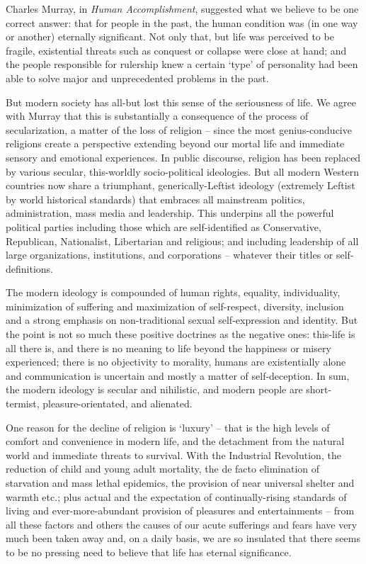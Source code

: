 \documentclass[
]{book}
\begin{document}
Charles Murray, in \emph{Human Accomplishment}, suggested what we believe to be one correct answer: that for people in the past, the human condition was (in one way or another) eternally significant. Not only that, but life was perceived to be fragile, existential threats such as conquest or collapse were close at hand; and the people responsible for rulership knew a certain `type' of personality had been able to solve major and unprecedented problems in the past.

But modern society has all-but lost this sense of the seriousness of life. We agree with Murray that this is substantially a consequence of the process of secularization, a matter of the loss of religion -- since the most genius-conducive religions create a perspective extending beyond our mortal life and immediate sensory and emotional experiences. In public discourse, religion has been replaced by various secular, this-worldly socio-political ideologies. But all modern Western countries now share a triumphant, generically-Leftist ideology (extremely Leftist by world historical standards) that embraces all mainstream politics, administration, mass media and leadership. This underpins all the powerful political parties including those which are self-identified as Conservative, Republican, Nationalist, Libertarian and religious; and including leadership of all large organizations, institutions, and corporations -- whatever their titles or self-definitions.

The modern ideology is compounded of human rights, equality, individuality, minimization of suffering and maximization of self-respect, diversity, inclusion and a strong emphasis on non-traditional sexual self-expression and identity. But the point is not so much these positive doctrines as the negative ones: this-life is all there is, and there is no meaning to life beyond the happiness or misery experienced; there is no objectivity to morality, humans are existentially alone and communication is uncertain and mostly a matter of self-deception. In sum, the modern ideology is secular and nihilistic, and modern people are short-termist, pleasure-orientated, and alienated.

One reason for the decline of religion is `luxury' -- that is the high levels of comfort and convenience in modern life, and the detachment from the natural world and immediate threats to survival. With the Industrial Revolution, the reduction of child and young adult mortality, the de facto elimination of starvation and mass lethal epidemics, the provision of near universal shelter and warmth etc.; plus actual and the expectation of continually-rising standards of living and ever-more-abundant provision of pleasures and entertainments -- from all these factors and others the causes of our acute sufferings and fears have very much been taken away and, on a daily basis, we are so insulated that there seems to be no pressing need to believe that life has eternal significance.
\end{document}

